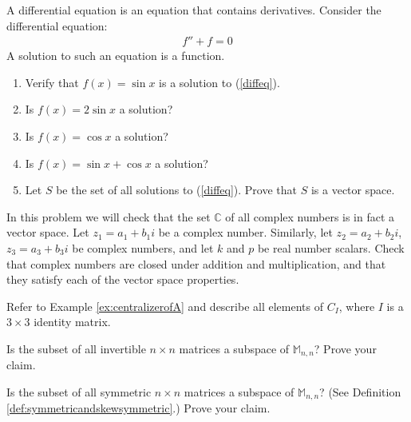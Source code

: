 \documentclass{ximera}
\begin{document}
 \begin{problem}\label{prob:abstractvectspacediffeq}
 A differential equation is an equation that contains derivatives.  Consider the differential equation:
 \begin{align}\label{diffeq} f''+f=0\end{align}
A solution to such an equation is a function.
  \begin{enumerate}
  \item Verify that $f(x)=\sin x$ is a solution to (\ref{diffeq}).
  \item Is $f(x)=2\sin x$ a solution?
  \item Is $f(x)=\cos x$ a solution?
  \item Is $f(x)=\sin x+\cos x$ a solution?
  \item Let $S$ be the set of all solutions to (\ref{diffeq}).  Prove that $S$ is a vector space.
  \end{enumerate}
  \end{problem}
  
\begin{problem}\label{prob:abstractvectspacecomplex}
In this problem we will check that the set $\mathbb{C}$ of all complex numbers is in fact a vector space.  Let $z_1 = a_1 + b_1 i$ be a complex number.  Similarly, let $z_2 = a_2 + b_2 i$, $z_3 = a_3 + b_3 i$ be complex numbers, and let $k$ and $p$ be real number scalars.  Check that complex numbers are closed under addition and multiplication, and that they satisfy each of the vector space properties.
\end{problem}

\begin{problem}\label{prob:abstractvectspace6}
Refer to Example \ref{ex:centralizerofA} and describe all elements of $C_I$, where $I$ is a $3\times 3$ identity matrix.
\end{problem}
  
\begin{problem}\label{prob:abstractvectspace7}
Is the subset of all invertible $n\times n$ matrices a subspace of $\mathbb{M}_{n,n}$?  Prove your claim. 
\end{problem}

\begin{problem}\label{prob:symmetricsubspace}
Is the subset of all symmetric $n\times n$ matrices a subspace of $\mathbb{M}_{n,n}$?  (See Definition \ref{def:symmetricandskewsymmetric}.)  Prove your claim. 
\end{problem}
\end{document}

